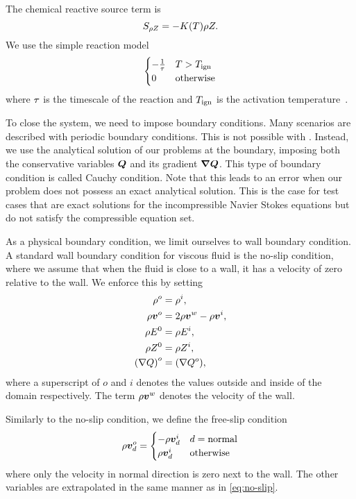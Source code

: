 The chemical reactive source term is
\begin{equation}\label{eq:source-reaction}
  \source[\QZ] = - K(T) \QZ.
\end{equation}
We use the simple reaction model
\begin{equation}\label{eq:reaction-model}
\begin{cases}
  - \frac{1}{\tau} & T > T_{\text{ign}}\\
  0 & \text{otherwise}
\end{cases}  
\end{equation}
where $\tau$ is the timescale of the reaction and $T_{\text{ign}}$ is the activation temperature~\cite{hidalgo2011ader,helzel2000modified}.

To close the system, we need to impose boundary conditions.
Many scenarios are described with periodic boundary conditions.
This is not possible with \exahype{}.
Instead, we use the analytical solution of our problems at the boundary, imposing both the conservative variables $\bm{Q}$ and its gradient $\gradQ$.
This type of boundary condition is called Cauchy condition.
Note that this leads to an error when our problem does not possess an exact analytical solution.
This is the case for test cases that are exact solutions for the incompressible Navier Stokes equations but do not satisfy the compressible equation set.

As a physical boundary condition, we limit ourselves to wall boundary condition.
A standard wall boundary condition for viscous fluid is the no-slip condition, where we assume that when the fluid is close to a wall, it has a velocity of zero relative to the wall.
We enforce this by setting
\begin{align}
  \label{eq:no-slip}
  \begin{split}
  \rho^o &= \rho^i, \\
  \rho \bm{v}^o &= 2 \rho \bm{v}^w - \rho \bm{v}^i, \\
  \rho E^0 &= \rho E^i,\\
  \rho Z^0 &= \rho Z^i,\\
  {(\nabla Q)}^o &= {(\nabla Q^o)},
  \end{split}
\end{align}
where a superscript of $o$ and $i$ denotes the values outside and inside of the domain respectively.
The term $\rho \bm{v}^w$ denotes the velocity of the wall.

Similarly to the no-slip condition, we define the free-slip condition
\begin{equation}
  \label{eq:free-slip}
  \rho \bm{v}^o_d = \begin{cases}
    -\rho \bm{v}^i_d & d = \text{normal} \\
    \rho \bm{v}^i_d & \text{otherwise}
    \end{cases}
\end{equation}
where only the velocity in normal direction is zero next to the wall.
The other variables are extrapolated in the same manner as in \cref{eq:no-slip}.

